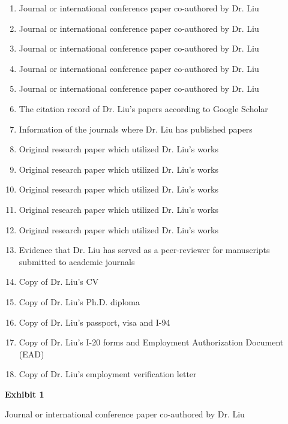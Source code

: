 \documentclass{article}
\begin{document}
\begin{enumerate}[label={Exhibit \arabic*:}]
    \item Journal or international conference paper co-authored by Dr. Liu 
    \item Journal or international conference paper co-authored by Dr. Liu 
    \item Journal or international conference paper co-authored by Dr. Liu 
    \item Journal or international conference paper co-authored by Dr. Liu 
    \item Journal or international conference paper co-authored by Dr. Liu 
    \item The citation record of Dr. Liu’s papers according to Google Scholar 
    \item Information of the journals where Dr. Liu has published papers 
    \item Original research paper which utilized Dr. Liu’s works 
    \item Original research paper which utilized Dr. Liu’s works 
    \item Original research paper which utilized Dr. Liu’s works  
    \item Original research paper which utilized Dr. Liu’s works 
    \item Original research paper which utilized Dr. Liu’s works 
    \item Evidence that Dr. Liu has served as a peer-reviewer for manuscripts submitted to academic journals
    \item Copy of Dr. Liu’s CV
    \item Copy of Dr. Liu’s Ph.D. diploma
    \item Copy of Dr. Liu’s passport, visa and I-94
    \item Copy of Dr. Liu’s I-20 forms and Employment Authorization Document (EAD) 
    \item Copy of Dr. Liu’s employment verification letter
\end{enumerate}

\clearpage

\vspace*{\fill}

\begin{center}

{\LARGE \bf
Exhibit 1 
}

\vspace{10\baselineskip}

{\large Journal or international conference paper co-authored by Dr. Liu}

\end{center}
\vspace*{\fill}
\end{document}
